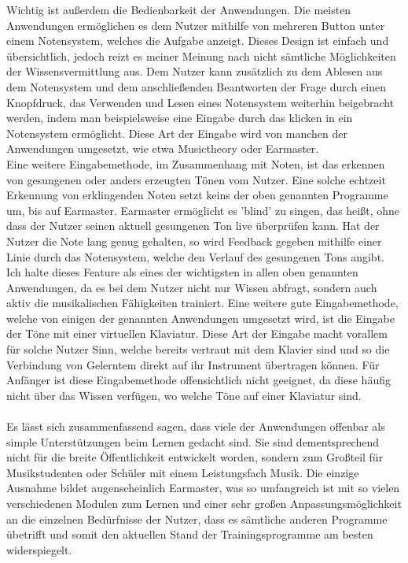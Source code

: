 Wichtig ist außerdem die Bedienbarkeit der Anwendungen. Die meisten Anwendungen ermöglichen es dem Nutzer mithilfe von mehreren Button unter einem Notensystem, welches die Aufgabe anzeigt. Dieses Design ist einfach und übersichtlich, 
jedoch reizt es meiner Meinung nach nicht sämtliche Möglichkeiten der Wissensvermittlung aus. Dem Nutzer kann zusätzlich zu dem Ablesen aus dem Notensystem und dem anschließenden Beantworten der Frage durch einen Knopfdruck, das Verwenden und Lesen eines Notensystem weiterhin beigebracht werden, 
indem man beispielsweise eine Eingabe durch das klicken in ein Notensystem ermöglicht. Diese Art der Eingabe wird von manchen der Anwendungen umgesetzt, wie etwa Musictheory oder Earmaster. \\
Eine weitere Eingabemethode, im Zusammenhang mit Noten, ist das erkennen von gesungenen oder anders erzeugten Tönen vom Nutzer. Eine solche echtzeit Erkennung von erklingenden Noten setzt keins der oben genannten Programme um, bis auf Earmaster. Earmaster ermöglicht es 'blind' zu singen, das heißt, ohne dass der Nutzer seinen aktuell gesungenen Ton live überprüfen kann. Hat der Nutzer die 
Note lang genug gehalten, so wird Feedback gegeben mithilfe einer Linie durch das Notensystem, welche den Verlauf des gesungenen Tons angibt. Ich halte dieses Feature als eines der wichtigsten in allen oben genannten Anwendungen, da es bei dem Nutzer nicht nur Wissen abfragt, sondern auch aktiv die musikalischen Fähigkeiten trainiert.
Eine weitere gute Eingabemethode, welche von einigen der genannten Anwendungen umgesetzt wird, ist die Eingabe der Töne mit einer virtuellen Klaviatur. Diese Art der Eingabe macht vorallem für solche Nutzer Sinn, welche bereits vertraut mit dem Klavier sind und so die Verbindung von Gelerntem direkt auf ihr Instrument übertragen können. Für 
Anfänger ist diese Eingabemethode offensichtlich nicht geeignet, da diese häufig nicht über das Wissen verfügen, wo welche Töne auf einer Klaviatur sind. \\\\
Es lässt sich zusammenfassend sagen, dass viele der Anwendungen offenbar als simple Unterstützungen beim Lernen gedacht sind. Sie sind dementsprechend nicht für die breite Öffentlichkeit entwickelt worden, sondern zum Großteil für Musikstudenten oder Schüler mit einem Leistungsfach Musik. Die einzige Ausnahme bildet augenscheinlich Earmaster, was so umfangreich ist mit so vielen verschiedenen Modulen zum Lernen und einer sehr großen Anpassungsmöglichkeit an die einzelnen Bedürfnisse der Nutzer, dass es sämtliche anderen Programme übetrifft und somit den aktuellen Stand der Trainingsprogramme am besten widerspiegelt. 
